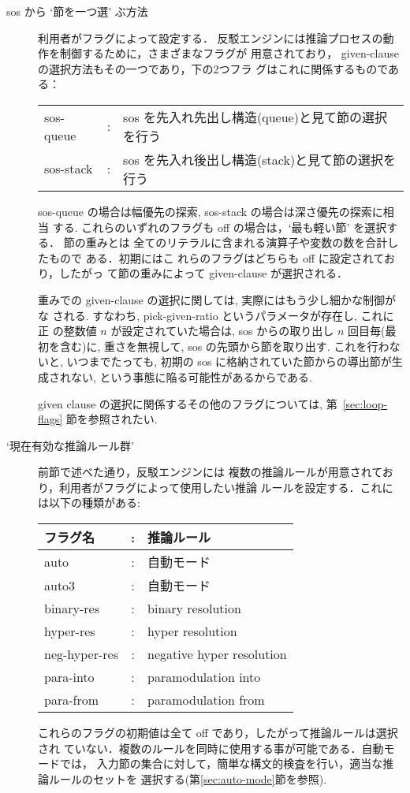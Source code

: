 \begin{description}
\item[sos から `節を一つ選' ぶ方法] 利用者がフラグによって設定する．
  反駁エンジンには推論プロセスの動作を制御するために，さまざまなフラグが
  用意されており， given-clause の選択方法もその一つであり，下の2つフラ
  グはこれに関係するものである：
  \begin{center}
    \begin{tabular}{|lcl|}\hline
      sos-queue  &:&  sos を先入れ先出し構造(queue)と見て節の選択を行う\\
      sos-stack  &:&  sos を先入れ後出し構造(stack)と見て節の選択を行う\\\hline
    \end{tabular}
  \end{center}

  sos-queue の場合は幅優先の探索, sos-stack の場合は深さ優先の探索に相当
  する. これらのいずれのフラグも off の場合は，`最も軽い節' を選択する．
  節の重みとは  全てのリテラルに含まれる演算子や変数の数を合計したもので
  ある．初期にはこ  れらのフラグはどちらも off に設定されており，したがっ
  て節の重みによって  given-clause が選択される．

  重みでの given-clause の選択に関しては, 実際にはもう少し細かな制御がな
  される. すなわち, pick-given-ratio というパラメータが存在し, これに正
  の整数値 $n$ が設定されていた場合は, sos からの取り出し $n$ 回目毎(最
  初を含む)に, 重さを無視して, sos の先頭から節を取り出す.  これを行わな
  いと, いつまでたっても, 初期の sos に格納されていた節からの導出節が生
  成されない, という事態に陥る可能性があるからである. 

  given clause の選択に関係するその他のフラグについては, 
  第~\ref{sec:loop-flags} 節を参照されたい. 

\item [`現在有効な推論ルール群'] 前節で述べた通り，反駁エンジンには
  複数の推論ルールが用意されており，利用者がフラグによって使用したい推論
  ルールを設定する．これには以下の種類がある:

  \begin{center}
    \begin{tabular}{|lcl|}\hline
      フラグ名      &:& 推論ルール \\\hline
      auto          &:& 自動モード\\
      auto3         &:& 自動モード \\
      binary-res    &:& binary resolution \\
      hyper-res     &:& hyper resolution \\
      neg-hyper-res &:& negative hyper resolution \\
      para-into     &:& paramodulation into \\
      para-from     &:& paramodulation from \\\hline
    \end{tabular}
  \end{center}
  これらのフラグの初期値は全て off であり，したがって推論ルールは選択され
  ていない．複数のルールを同時に使用する事が可能である．自動モードでは，
  入力節の集合に対して，簡単な構文的検査を行い，適当な推論ルールのセットを
  選択する(第\ref{sec:auto-mode}節を参照). 


\end{description}
